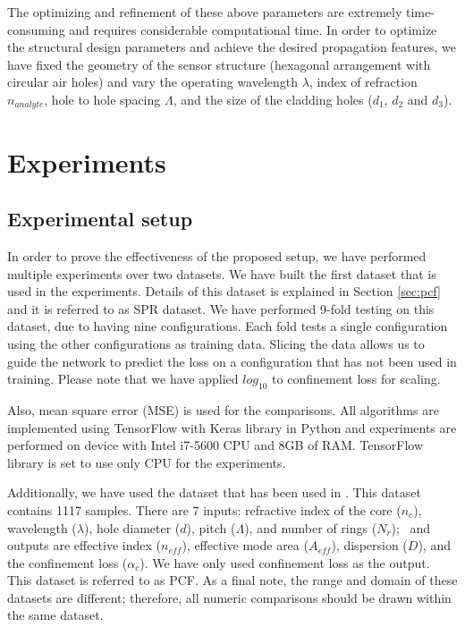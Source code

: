 \documentclass[journal]{IEEEtran}
\begin{document}
The optimizing and refinement of these above parameters are extremely time-consuming and requires considerable computational time. In order to optimize the structural design parameters and achieve the desired propagation features, we have fixed the geometry of the sensor structure (hexagonal arrangement with circular air holes) and vary the operating wavelength $\lambda$, index of refraction $n_{analyte}$, hole to hole spacing $\Lambda$, and the size of the cladding holes ($d_1$, $d_2$ and $d_3$).


\section{Experiments}
\label{sec:exp}

\subsection{Experimental setup}

\def\dszero{PCF}
In order to prove the effectiveness of the proposed setup, we have performed multiple experiments over two datasets. We have built the first dataset that is used in the experiments. Details of this dataset is explained in Section \ref{sec:pcf} and it is referred to as SPR dataset. We have performed 9-fold testing on this dataset, due to having nine configurations. Each fold tests a single configuration using the other configurations as training data. Slicing the data allows us to guide the network to predict the loss on a configuration that has not been used in training. Please note that we have applied $log_{10}$ to confinement loss for scaling.

Also, mean square error (MSE) is used for the comparisons. All algorithms are implemented using TensorFlow with Keras library in Python and experiments are performed on device with Intel i7-5600 CPU and 8GB of RAM. TensorFlow library is set to use only CPU for the experiments.

Additionally, we have used the dataset that has been used in \cite{paper0}. This dataset contains 1117 samples. There are 7 inputs: refractive index of the core ($n_c$), wavelength ($\lambda$), hole diameter ($d$), pitch ($\Lambda$), and number of rings ($N_r$);  and outputs are effective index ($n_{eff}$), effective mode area ($A_{eff}$), dispersion ($D$), and the confinement loss ($\alpha_c$). We have only used confinement loss as the output. This dataset is referred to as PCF. As a final note, the range and domain of these datasets are different; therefore, all numeric comparisons should be drawn within the same dataset.
\end{document}
